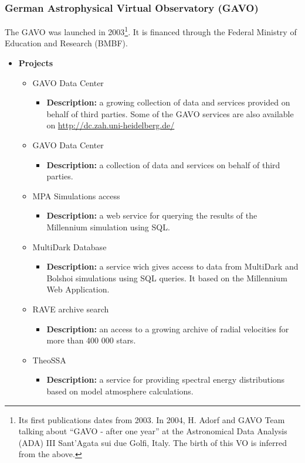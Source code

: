 \subsubsection{German Astrophysical Virtual Observatory (GAVO)}
The GAVO \cite{website:gavo-home} was launched in 2003\footnote{Its first
publications dates from 2003. In 2004, H. Adorf and GAVO Team talking about
``GAVO - after one year'' at the Astronomical Data Analysis (ADA) III Sant'Agata
sui due Golfi, Italy. The birth of this VO is inferred from the above.}. It is
financed through the Federal Ministry of Education and Research (BMBF).

\begin{itemize}
\item \textbf{Projects}
\begin{itemize}
\item GAVO Data Center
\begin{itemize}
\item \textbf{Description:} a growing collection of data and services provided
on behalf of third parties. Some of the GAVO services are also available on
\url{http://dc.zah.uni-heidelberg.de/}
\end{itemize}
\item GAVO Data Center
\begin{itemize}
\item \textbf{Description:} a collection of data and services on behalf of third
parties.
\end{itemize}
\item MPA Simulations access
\begin{itemize}
\item \textbf{Description:} a web service for querying the results of the
Millennium simulation using SQL.
\end{itemize}
\item MultiDark Database
\begin{itemize}
\item \textbf{Description:} a service wich gives access to data from MultiDark
and Bolshoi simulations using SQL queries.  It based on the Millennium Web
Application.
\end{itemize}
\item RAVE archive search
\begin{itemize}
\item \textbf{Description:} an access to a growing archive of radial velocities
for more than 400 000 stars.
\end{itemize}
\item TheoSSA
\begin{itemize}
\item \textbf{Description:} a service for providing spectral energy
distributions based on model atmosphere calculations.
\end{itemize}
\end{itemize}
\end{itemize}

